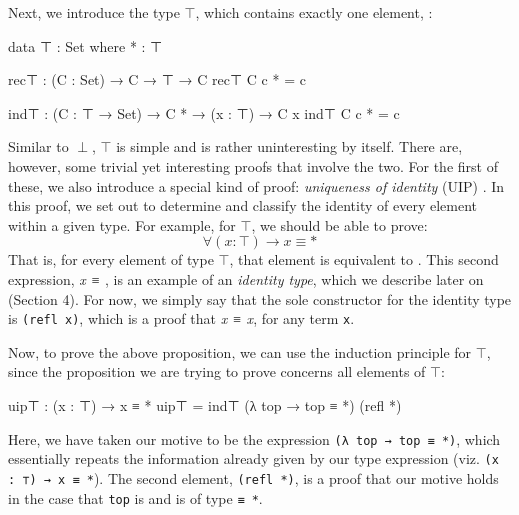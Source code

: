 \documentclass[12pt]{article}
\begin{document}
Next, we introduce the type \(\top\), which contains exactly one element,
{\tt *}:
\begin{center}
\begin{minipage}{0.9\textwidth}
\begin{code}
data ⊤ : Set where
  * : ⊤

rec⊤ : (C : Set) → C → ⊤ → C
rec⊤ C c * = c

ind⊤ : (C : ⊤ → Set) → C * → (x : ⊤) → C x
ind⊤ C c * = c
\end{code}
\end{minipage}
\end{center}
Similar to \(\perp\), \(\top\) is simple and is rather uninteresting by itself.
There are, however, some trivial yet interesting proofs that involve the two.
For the first of these, we also introduce a special kind of proof: {\it uniqueness
of identity} (UIP) \cite{}. In this proof, we set out to determine and classify
the identity of every element within a given type. For example, for \(\top\), we
should be able to prove:
$$\forall (x : \top) \rightarrow x ≡ *$$
That is, for every element of type \(\top\), that element is equivalent to {\tt *}.
This second expression, {\it x ≡} {\tt *}, is an example of an {\it identity type},
which we describe later on (Section 4). For now, we simply say that the
sole constructor for the identity type is {\tt (refl x)}, which is a proof that
{\it x ≡ x}, for any term {\tt x}.

Now, to prove the above proposition, we can use the induction principle for
\(\top\), since the proposition we are trying to prove concerns all elements
of \(\top\):
\begin{center}
\begin{minipage}{0.9\textwidth}
\begin{code}
uip⊤ : (x : ⊤) → x ≡ *
uip⊤ = ind⊤ (λ top → top ≡ *) (refl *)
\end{code}
\end{minipage}
\end{center}
Here, we have taken our motive to be the expression {\tt (λ top → top ≡ *)},
which essentially repeats the information already given by our type expression
(viz. {\tt (x : ⊤) → x ≡ *}). The second element, {\tt (refl *)}, is a proof
that our motive holds in the case that {\tt top} is {\tt *} and is of type
{\tt * ≡ *}.
\end{document}
